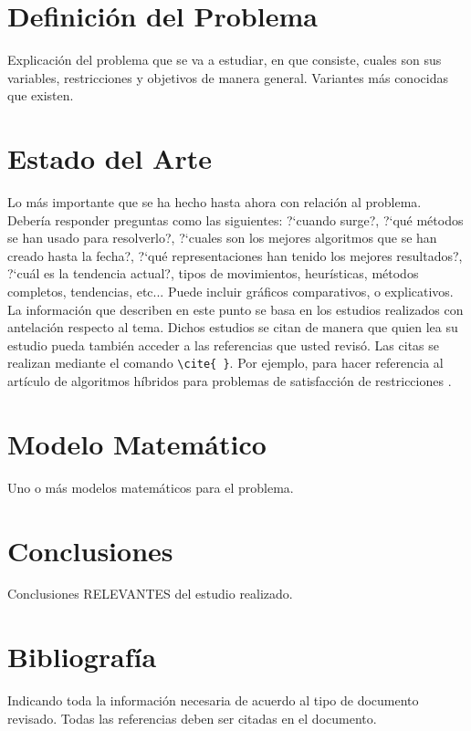 \documentclass[letter, 10pt]{article}
\begin{document}
\section{Definici\'on del Problema}
Explicaci\'on del problema que se va a estudiar, en que consiste, cuales son sus variables, restricciones y objetivos de manera general.
Variantes m\'as conocidas que existen.

\section{Estado del Arte}
Lo m\'as importante que se ha hecho hasta ahora con relaci\'on al problema. Deber\'ia responder preguntas como las siguientes:
?`cuando surge?, ?`qu\'e m\'etodos se han usado para resolverlo?, ?`cuales son los mejores algoritmos que se han creado hasta
la fecha?, ?`qu\'e representaciones han tenido los mejores resultados?, ?`cu\'al es la tendencia actual?, tipos de movimientos,
heur\'isticas, m\'etodos completos, tendencias, etc... Puede incluir gr\'aficos comparativos, o explicativos.\\
La informaci\'on que describen en este punto se basa en los estudios realizados con antelaci\'on respecto al tema.
Dichos estudios se citan de manera que quien lea su estudio pueda tambi\'en
 acceder a las referencias que usted revis\'o. Las citas se realizan mediante el comando \verb+\cite{ }+.
Por ejemplo, para hacer referencia al art\'iculo de algoritmos h\'ibridos para problemas de satisfacci\'on 
 de restricciones \cite{Prosser93Hybrid}.

\section{Modelo Matem\'atico}
Uno o m\'as modelos matem\'aticos para el problema.

\section{Conclusiones}
Conclusiones RELEVANTES del estudio realizado.

\section{Bibliograf\'ia}
Indicando toda la informaci\'on necesaria de acuerdo al tipo de documento revisado. Todas las referencias deben ser 
citadas en el documento.


\end{document}

